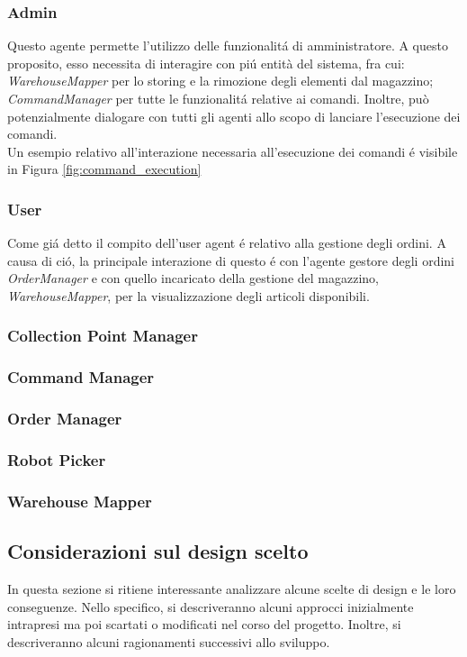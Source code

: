 \subsubsection{Admin}
Questo agente permette l'utilizzo delle funzionalit\'a di amministratore. A questo proposito, esso necessita di interagire con pi\'u entità del sistema, fra cui: \textit{WarehouseMapper} per lo storing e la rimozione degli elementi dal magazzino; \textit{CommandManager} per tutte le funzionalit\'a relative ai comandi. Inoltre, può potenzialmente dialogare con tutti gli agenti allo scopo di lanciare l'esecuzione dei comandi.\\
Un esempio relativo all'interazione necessaria all'esecuzione dei comandi \'e visibile in Figura \ref{fig:command_execution}

\subsubsection{User}
Come gi\'a detto il compito dell'user agent \'e relativo alla gestione degli ordini. A causa di ci\'o, la principale interazione di questo \'e con l'agente gestore degli ordini \textit{OrderManager} e con quello incaricato della gestione del magazzino, \textit{WarehouseMapper}, per la visualizzazione degli articoli disponibili.

\subsubsection{Collection Point Manager}
\subsubsection{Command Manager}
\subsubsection{Order Manager}
\subsubsection{Robot Picker}
\subsubsection{Warehouse Mapper}

\subsection{Considerazioni sul design scelto}
In questa sezione si ritiene interessante analizzare alcune scelte di design e le loro conseguenze. Nello specifico, si descriveranno alcuni approcci inizialmente intrapresi ma poi scartati o modificati nel corso del progetto. Inoltre, si descriveranno alcuni ragionamenti successivi allo sviluppo.

